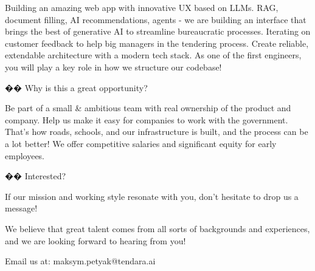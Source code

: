 Building an amazing web app with innovative UX based on LLMs. RAG, document filling, AI recommendations, agents - we are building an interface that brings the best of generative AI to streamline bureaucratic processes.
Iterating on customer feedback to help big managers in the tendering process. 
Create reliable, extendable architecture with a modern tech stack. As one of the first engineers, you will play a key role in how we structure our codebase!


�� Why is this a great opportunity?

Be part of a small & ambitious team with real ownership of the product and company.
Help us make it easy for companies to work with the government. That’s how roads, schools, and our infrastructure is built, and the process can be a lot better!
We offer competitive salaries and significant equity for early employees.


�� Interested?

If our mission and working style resonate with you, don’t hesitate to drop us a message!

We believe that great talent comes from all sorts of backgrounds and experiences, and we are looking forward to hearing from you!

Email us at: maksym.petyak@tendara.ai


